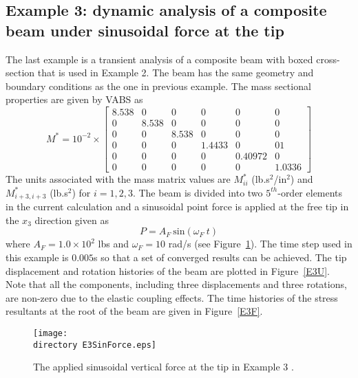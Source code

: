 \subsection{Example 3: dynamic analysis of a composite beam under sinusoidal force at the tip}

The last example is a transient analysis of a composite beam with boxed cross-section that is used in Example 2. The beam has the same geometry and boundary conditions as the one in previous example. The mass sectional properties are given by VABS \cite{Yu-etal:2002,Wang-Yu:2012} as
\begin{equation}
    \label{E3Mass}
    M^* = 10^{-2} \times \begin{bmatrix}
	8.538 & 0     & 0     & 0      & 0      & 0      \\
	0       & 8.538 & 0     & 0      & 0      & 0      \\
	0       & 0     & 8.538 & 0      & 0      & 0      \\
	0       & 0     & 0     & 1.4433  & 0  & 01 \\
	0       & 0     & 0     & 0  & 0.40972  &0 \\
	0       & 0     & 0     & 0 & 0 & 1.0336
\end{bmatrix}    
\end{equation}
The units associated with the mass matrix values are $M_{ii}^*$ (lb.s$^2$/in$^2$) and $M_{i+3,i+3}^*$ (lb.s$^2$) for $i = 1,2,3$. The beam is divided into two $5^{th}$-order elements in the current calculation and a sinusoidal point force is applied at the free tip in the $x_3$ direction given as
\begin{equation}
    \label{E3AppliedForce}
    P = A_F~\text{sin}(\omega_F~t)
\end{equation}
where $A_F = 1.0 \times 10^2$ lbs and $\omega_F = 10$ rad/s (see Figure~\ref{E3SinForce}). The time step used in this example is $0.005$s so that a set of converged results can be achieved. The tip displacement and rotation histories of the beam are plotted in Figure~\ref{E3U}. Note that all the components, including three displacements and three rotations, are non-zero due to the elastic coupling effects. The time histories of the stress resultants at the root of the beam are given in Figure~\ref{E3F}.
\begin{figure}
    \centering
    \texttt{[image: \\directory E3SinForce.eps]}
    \caption{The applied sinusoidal vertical force at the tip in Example 3 .}
    \label{E3SinForce}
\end{figure}

